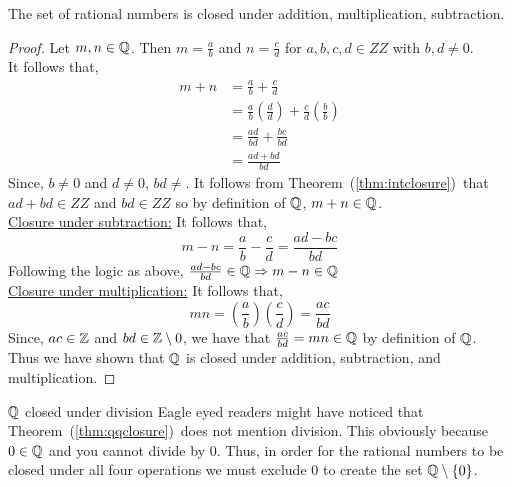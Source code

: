 \begin{thm}{\label{thm:qqclosure}}
    The set of rational numbers is closed under addition, multiplication, subtraction.
    \begin{proof}
        Let $m, n \in \mathbb Q$. Then $m = \frac{a}{b}$ and $n = \frac{c}{d}$ for $a, b, c, d \in ZZ$ with $b, d \neq 0$.\\
         It follows that, 
        \begin{align*}
            m + n &= \frac{a}{b} + \frac{c}{d} \\
            &= \frac{a}{b}\left(\frac{d}{d}\right) + \frac{c}{d}\left(\frac{b}{b}\right) \\
            &= \frac{ad}{bd} + \frac{bc}{bd} \\
            &= \frac{ad + bd}{bd}
        \end{align*}
        Since, $b \neq 0$ and $d \neq 0$, $bd \neq$. It follows from Theorem~(\ref{thm:intclosure})~that $ad + bd \in ZZ$ and $bd \in ZZ$ so by definition of $\mathbb Q$, $m +n \in \mathbb Q$. \\

        \hspace*{2em} \underline{Closure under subtraction:} It follows that,
        \begin{equation*}
            m - n = \frac{a}{b} - \frac{c}{d} = \frac{ad - bc}{bd}
        \end{equation*}
        Following the logic as above, $\frac{ad - bc}{bd} \in \mathbb Q \Rightarrow m - n \in \mathbb Q$ \\
        \hspace*{2em} \underline{Closure under multiplication:} It follows that, 
        \begin{equation*}
            mn = \left(\frac{a}{b}\right)\left(\frac{c}{d}\right) = \frac{ac}{bd}
        \end{equation*}
        Since, $ac \in \mathbb Z$ and $bd \in \mathbb Z \setminus {0}$, we have that $\frac{ac}{bd} = mn \in \mathbb Q$ by definition of $\mathbb Q$. \\
        Thus we have shown that $\mathbb Q$ is closed under addition, subtraction, and multiplication.
    \end{proof}
\end{thm}

\begin{note}{$\mathbb Q$ closed under division}{}
    Eagle eyed readers might have noticed that Theorem~(\ref{thm:qqclosure})~does not mention division. This obviously because $0 \in \mathbb Q$ and you cannot divide by $0$. Thus, in order for the rational numbers to be closed under all four operations we must exclude $0$ to create the set $\mathbb Q \setminus \{0\}$. 
\end{note}

